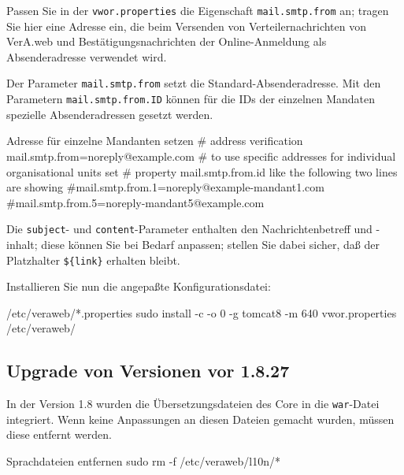 \begin{minipage}{\linewidth}
Passen Sie in der \texttt{vwor.properties} die Eigenschaft
\texttt{mail.smtp.from} an; tragen Sie hier eine Adresse ein, die beim
Versenden von Verteilernachrichten von VerA.web und Bestätigungsnachrichten der Online-Anmeldung
als Absenderadresse verwendet wird.

Der Parameter \texttt{mail.smtp.from} setzt die Standard-Absenderadresse.
Mit den Parametern \texttt{mail.smtp.from.ID} können für die IDs der einzelnen
Mandaten spezielle Absenderadressen gesetzt werden.

\begin{lstdump}{Adresse für einzelne Mandanten setzen}
# address verification
mail.smtp.from=noreply@example.com
# to use specific addresses for individual organisational units set
# property mail.smtp.from.{id} like the following two lines are showing
#mail.smtp.from.1=noreply@example-mandant1.com
#mail.smtp.from.5=noreply-mandant5@example.com
\end{lstdump}

\ifoa

Die \texttt{subject}- und
\texttt{content}-Parameter enthalten den Nachrichtenbetreff und
-inhalt; diese können Sie bei Bedarf anpassen; stellen Sie dabei
sicher, daß der Platzhalter \texttt{\$\{link\}} erhalten bleibt.

\fi%

\end{minipage}

\begin{minipage}{\linewidth}
Installieren Sie nun die angepaßte Konfigurationsdatei:

\begin{lstdump}{/etc/veraweb/*.properties}
sudo install -c -o 0 -g tomcat8 -m 640 vwor.properties /etc/veraweb/
\end{lstdump}
\end{minipage}

\subsection{Upgrade von Versionen vor 1.8.27}\label{subsec:upgrade-1827}

\begin{minipage}{\linewidth}
In der Version 1.8 wurden die Übersetzungsdateien des Core in die
\texttt{war}-Datei integriert. Wenn keine Anpassungen an diesen Dateien
gemacht wurden, müssen diese entfernt werden.

\begin{lstdump}{Sprachdateien entfernen}
sudo rm -f /etc/veraweb/l10n/*
\end{lstdump}
\end{minipage}

